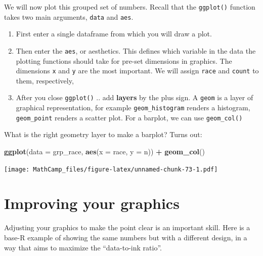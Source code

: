 \documentclass[
]{book}
\newenvironment{Shaded}{\begin{snugshade}}{\end{snugshade}}
\newcommand{\DataTypeTok}[1]{\textcolor[rgb]{0.13,0.29,0.53}{#1}}
\newcommand{\KeywordTok}[1]{\textcolor[rgb]{0.13,0.29,0.53}{\textbf{#1}}}
\newcommand{\NormalTok}[1]{#1}
\newcommand{\OperatorTok}[1]{\textcolor[rgb]{0.81,0.36,0.00}{\textbf{#1}}}
\newcommand{\StringTok}[1]{\textcolor[rgb]{0.31,0.60,0.02}{#1}}
\providecommand{\tightlist}{%
  \setlength{\itemsep}{0pt}\setlength{\parskip}{0pt}}
\theoremstyle{definition}
\theoremstyle{definition}
\theoremstyle{definition}
\theoremstyle{definition}
\theoremstyle{remark}
\begin{document}
We will now plot this grouped set of numbers. Recall that the \texttt{ggplot()} function takes two main arguments, \texttt{data} and \texttt{aes}.

\begin{enumerate}
\def\labelenumi{\arabic{enumi}.}
\tightlist
\item
  First enter a single dataframe from which you will draw a plot.
\item
  Then enter the \texttt{aes}, or aesthetics. This defines which variable in the data the plotting functions should take for pre-set dimensions in graphics. The dimensions \texttt{x} and \texttt{y} are the most important. We will assign \texttt{race} and \texttt{count} to them, respectively,
\item
  After you close \texttt{ggplot()} .. add \textbf{layers} by the plus sign. A \texttt{geom} is a layer of graphical representation, for example \texttt{geom\_histogram} renders a histogram, \texttt{geom\_point} renders a scatter plot. For a barplot, we can use \texttt{geom\_col()}
\end{enumerate}

What is the right geometry layer to make a barplot? Turns out:

\begin{Shaded}
\begin{Highlighting}[]
\KeywordTok{ggplot}\NormalTok{(}\DataTypeTok{data =}\NormalTok{ grp_race, }\KeywordTok{aes}\NormalTok{(}\DataTypeTok{x =}\NormalTok{ race, }\DataTypeTok{y =}\NormalTok{ n)) }\OperatorTok{+}\StringTok{ }\KeywordTok{geom_col}\NormalTok{()}
\end{Highlighting}
\end{Shaded}

\texttt{[image: MathCamp\_files/figure-latex/unnamed-chunk-73-1.pdf]}

\hypertarget{improving-your-graphics}{%
\section{Improving your graphics}\label{improving-your-graphics}}

Adjusting your graphics to make the point clear is an important skill. Here is a base-R example of showing the same numbers but with a different design, in a way that aims to maximize the ``data-to-ink ratio''.
\end{document}
